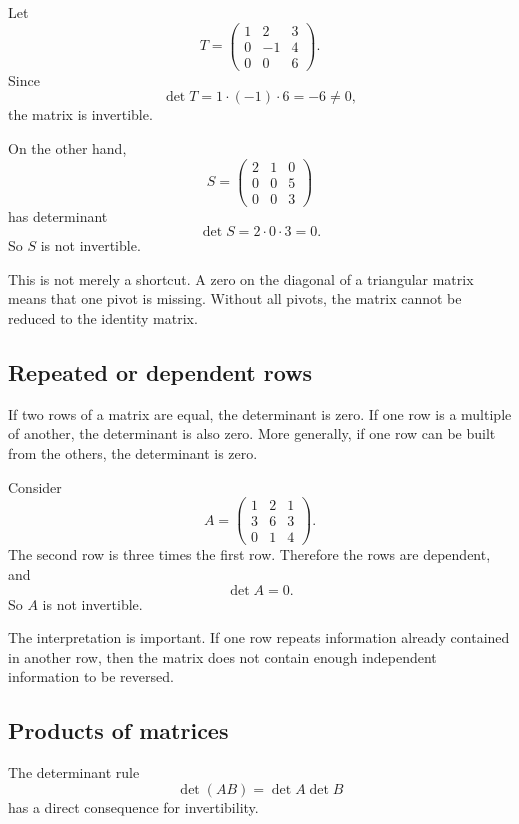 \begin{examplebox}
Let
\[
T=\begin{pmatrix}
1&2&3\\
0&-1&4\\
0&0&6
\end{pmatrix}.
\]
Since
\[
\det T=1\cdot(-1)\cdot6=-6\ne0,
\]
the matrix is invertible.

On the other hand,
\[
S=\begin{pmatrix}
2&1&0\\
0&0&5\\
0&0&3
\end{pmatrix}
\]
has determinant
\[
\det S=2\cdot0\cdot3=0.
\]
So \(S\) is not invertible.
\end{examplebox}

This is not merely a shortcut. A zero on the diagonal of a triangular matrix means that one pivot is missing. Without all pivots, the matrix cannot be reduced to the identity matrix.

\subsection{Repeated or dependent rows}

If two rows of a matrix are equal, the determinant is zero. If one row is a multiple of another, the determinant is also zero. More generally, if one row can be built from the others, the determinant is zero.

\begin{examplebox}
Consider
\[
A=\begin{pmatrix}
1&2&1\\
3&6&3\\
0&1&4
\end{pmatrix}.
\]
The second row is three times the first row. Therefore the rows are dependent, and
\[
\det A=0.
\]
So \(A\) is not invertible.
\end{examplebox}

The interpretation is important. If one row repeats information already contained in another row, then the matrix does not contain enough independent information to be reversed.

\subsection{Products of matrices}

The determinant rule
\[
\det(AB)=\det A\det B
\]
has a direct consequence for invertibility.

